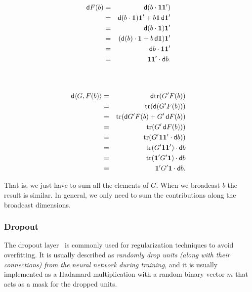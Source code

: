 \documentclass[pdflatex,sn-mathphys-num]{sn-jnl}%
\theoremstyle{thmstyleone}%
\theoremstyle{thmstyletwo}%
\theoremstyle{thmstylethree}%
\begin{document}
\begin{minipage}{.45\textwidth}
\begin{eqnarray*}
    \dif F(b)
    &=& \dif(b \cdot \vec 1 \vec 1') \\
    &=& \dif(b \cdot \vec 1) \vec 1' + b \vec 1 \dif \vec 1' \\
    &=& \dif(b \cdot \vec 1) \vec 1' \\
    &=& (\dif(b) \cdot \vec 1 + b \dif \vec 1) \vec 1' \\
    &=& \dif b \cdot \vec 1  \vec 1' \\
    &=& \vec 1 \vec 1' \cdot \dif b. \\
    && \\
    && \\
\end{eqnarray*}
\end{minipage}%
\begin{minipage}{.5\textwidth}
\begin{eqnarray*}
    \dif\langle G,F(b)\rangle
    &=& \dif\trace(G' F(b)) \\
    &=& \trace(\dif(G' F(b))) \\
    &=& \trace(\dif G' F(b) + G' \dif F(b)) \\
    &=& \trace(G' \dif F(b))) \\
    &=& \trace(G' \vec 1 \vec 1' \cdot \dif b)) \\
    &=& \trace(G' \vec 1 \vec 1') \cdot \dif b \\
    &=& \trace(\vec 1' G' \vec 1) \cdot \dif b \\
    &=& \vec 1' G' \vec 1 \cdot \dif b. \\
\end{eqnarray*}
\end{minipage}

That is, we just have to sum all the elements of \(G\). When we broadcast \(b\)
the result is similar. In general, we only need to sum the contributions along
the broadcast dimensions.

\subsubsection{Dropout}

The dropout layer~\cite{srivastava2014} is commonly used for regularization
techniques to avoid overfitting. It is usually described as \emph{randomly drop units (along with their connections) from the neural network during training}, and it
is usually implemented as a Hadamard multiplication with a random binary vector
\(m\) that acts as a mask for the dropped units.
\end{document}
